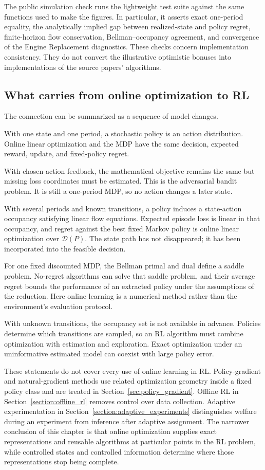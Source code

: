 The public simulation check runs the lightweight test suite against the same functions used to make the figures. In particular, it asserts exact one-period equality, the analytically implied gap between realized-state and policy regret, finite-horizon flow conservation, Bellman--occupancy agreement, and convergence of the Engine Replacement diagnostics. These checks concern implementation consistency. They do not convert the illustrative optimistic bonuses into implementations of the source papers' algorithms.

\subsection{What carries from online optimization to RL}
\label{sec:online_synthesis}

The connection can be summarized as a sequence of model changes.

With one state and one period, a stochastic policy is an action distribution. Online linear optimization and the MDP have the same decision, expected reward, update, and fixed-policy regret.

With chosen-action feedback, the mathematical objective remains the same but missing loss coordinates must be estimated. This is the adversarial bandit problem. It is still a one-period MDP, so no action changes a later state.

With several periods and known transitions, a policy induces a state-action occupancy satisfying linear flow equations. Expected episode loss is linear in that occupancy, and regret against the best fixed Markov policy is online linear optimization over $\mathcal D(P)$. The state path has not disappeared; it has been incorporated into the feasible decision.

For one fixed discounted MDP, the Bellman primal and dual define a saddle problem. No-regret algorithms can solve that saddle problem, and their average regret bounds the performance of an extracted policy under the assumptions of the reduction. Here online learning is a numerical method rather than the environment's evaluation protocol.

With unknown transitions, the occupancy set is not available in advance. Policies determine which transitions are sampled, so an RL algorithm must combine optimization with estimation and exploration. Exact optimization under an uninformative estimated model can coexist with large policy error.

These statements do not cover every use of online learning in RL. Policy-gradient and natural-gradient methods use related optimization geometry inside a fixed policy class and are treated in Section~\ref{sec:policy_gradient}. Offline RL in Section~\ref{section:offline_rl} removes control over data collection. Adaptive experimentation in Section~\ref{section:adaptive_experiments} distinguishes welfare during an experiment from inference after adaptive assignment. The narrower conclusion of this chapter is that online optimization supplies exact representations and reusable algorithms at particular points in the RL problem, while controlled states and controlled information determine where those representations stop being complete.
